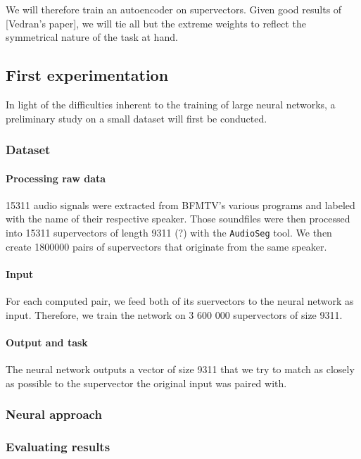 \documentclass[conference]{IEEEtran}
\begin{document}
We will therefore train an autoencoder on supervectors. Given good results of
[Vedran's paper], we will tie all but the extreme weights to reflect the
symmetrical nature of the task at hand.

\subsection{First experimentation}

In light of the difficulties inherent to the training of large neural networks,
a preliminary study on a small dataset will first be conducted.

\subsubsection{Dataset}

\paragraph{Processing raw data}

15311 audio signals were extracted from BFMTV's various programs and labeled
with the name of their respective speaker. Those soundfiles were then processed
into 15311 supervectors of length 9311 (?) with the \texttt{AudioSeg} tool.
We then create 1800000 pairs of supervectors that originate from the same
speaker.

\paragraph{Input}

For each computed pair, we feed both of its suervectors to the neural network as
input. Therefore, we train the network on 3 600 000 supervectors of size 9311.

\paragraph{Output and task}

The neural network outputs a vector of size 9311 that we try to match as closely
as possible to the supervector the original input was paired with.

\subsubsection{Neural approach}

\subsubsection{Evaluating results}
\end{document}
